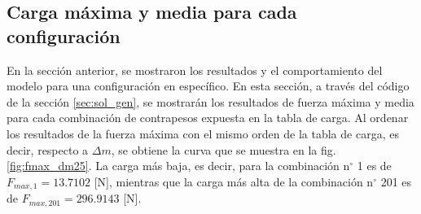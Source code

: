 %
 
\newpage
 
\subsection{Carga máxima y media para cada configuración} 

En la sección anterior, se mostraron los resultados y el comportamiento del modelo para una configuración en específico. En esta sección, a través del código de la sección \ref{sec:sol_gen}, se mostrarán los resultados de fuerza máxima y media para cada combinación de contrapesos expuesta en la tabla de carga. Al ordenar los resultados de la fuerza máxima con el mismo orden de la tabla de carga, es decir, respecto a $\Delta m$, se obtiene la curva que se muestra en la fig. \ref{fig:fmax_dm25}. La carga más baja, es decir, para la combinación n$^{\circ}$ 1 es de $F_{max,1} = 13.7102$ [N], mientras que la carga más alta de la combinación n$^{\circ}$ 201 es de $F_{max,201} = 296.9143$ [N].

